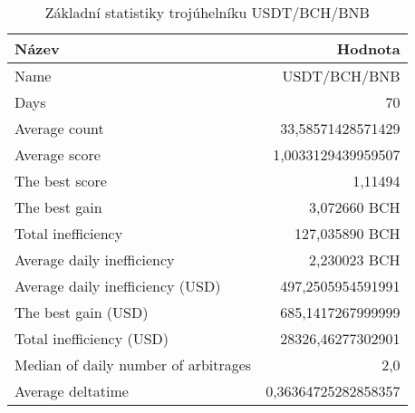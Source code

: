 \begin{table}\centering
\caption{Základní statistiky trojúhelníku USDT/BCH/BNB}
\label{USDTBCHBNB_stats}
\begin{tabular}{|| l | r ||}
\hline Název & Hodnota \\ 
\hline\hline Name & USDT/BCH/BNB \\ 
\hline Days & 70 \\ 
\hline Average count & 33,58571428571429 \\ 
\hline Average score & 1,0033129439959507 \\ 
\hline The best score & 1,11494 \\ 
\hline The best gain & 3,072660 BCH \\ 
\hline Total inefficiency & 127,035890 BCH \\ 
\hline Average daily inefficiency & 2,230023 BCH \\ 
\hline Average daily inefficiency (USD) & 497,2505954591991 \\ 
\hline The best gain (USD) & 685,1417267999999 \\ 
\hline Total inefficiency (USD) & 28326,46277302901 \\ 
\hline Median of daily number of arbitrages & 2,0 \\ 
\hline Average deltatime & 0,36364725282858357 \\ 
\hline
\end{tabular}
\end{table}